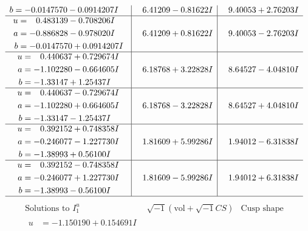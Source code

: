 \documentclass[1p]{elsarticle_modified}
\theoremstyle{definition}
\newcommand{\I}{\sqrt{-1}}
\begin{document}
$$\begin{array}{c|c|c}
\begin{aligned}
b &= -0.0147570 - 0.0914207 I\end{aligned}
 & \phantom{-}6.41209 - 0.81622 I & \phantom{-}9.40053 + 2.76203 I \\ \hline\begin{aligned}
u &= \phantom{-}0.483139 - 0.708206 I \\
a &= -0.886828 - 0.978020 I \\
b &= -0.0147570 + 0.0914207 I\end{aligned}
 & \phantom{-}6.41209 + 0.81622 I & \phantom{-}9.40053 - 2.76203 I \\ \hline\begin{aligned}
u &= \phantom{-}0.440637 + 0.729674 I \\
a &= -1.102280 - 0.664605 I \\
b &= -1.33147 + 1.25437 I\end{aligned}
 & \phantom{-}6.18768 + 3.22828 I & \phantom{-}8.64527 - 4.04810 I \\ \hline\begin{aligned}
u &= \phantom{-}0.440637 - 0.729674 I \\
a &= -1.102280 + 0.664605 I \\
b &= -1.33147 - 1.25437 I\end{aligned}
 & \phantom{-}6.18768 - 3.22828 I & \phantom{-}8.64527 + 4.04810 I \\ \hline\begin{aligned}
u &= \phantom{-}0.392152 + 0.748358 I \\
a &= -0.246077 - 1.227730 I \\
b &= -1.38993 + 0.56100 I\end{aligned}
 & \phantom{-}1.81609 + 5.99286 I & \phantom{-}1.94012 - 6.31838 I \\ \hline\begin{aligned}
u &= \phantom{-}0.392152 - 0.748358 I \\
a &= -0.246077 + 1.227730 I \\
b &= -1.38993 - 0.56100 I\end{aligned}
 & \phantom{-}1.81609 - 5.99286 I & \phantom{-}1.94012 + 6.31838 I\\
 \hline 
 \end{array}$$\newpage$$\begin{array}{c|c|c}  
\text{Solutions to }I^u_{1}& \I (\text{vol} + \sqrt{-1}CS) & \text{Cusp shape}\\
 \hline 
\begin{aligned}
u &= -1.150190 + 0.154691 I \\

\end{aligned}
\end{array}$$
\end{document}
